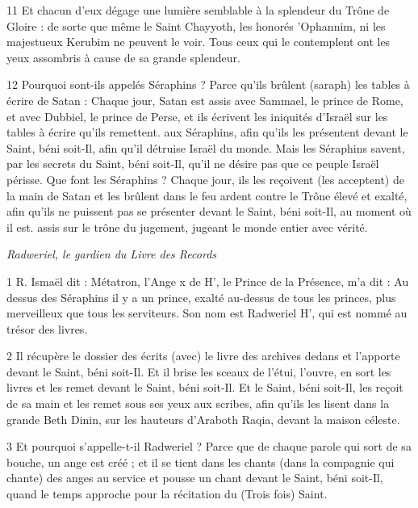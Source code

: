 \par 11 Et chacun d'eux dégage une lumière semblable à la splendeur du Trône de Gloire : de sorte que même le Saint Chayyoth, les honorés 'Ophannim, ni les majestueux Kerubim ne peuvent le voir. Tous ceux qui le contemplent ont les yeux assombris à cause de sa grande splendeur.

\par 12 Pourquoi sont-ils appelés Séraphins ? Parce qu'ils brûlent (saraph) les tables à écrire de Satan : Chaque jour, Satan est assis avec Sammael, le prince de Rome, et avec Dubbiel, le prince de Perse, et ils écrivent les iniquités d'Israël sur les tables à écrire qu'ils remettent. aux Séraphins, afin qu'ils les présentent devant le Saint, béni soit-Il, afin qu'il détruise Israël du monde. Mais les Séraphins savent, par les secrets du Saint, béni soit-Il, qu'il ne désire pas que ce peuple Israël périsse. Que font les Séraphins ? Chaque jour, ils les reçoivent (les acceptent) de la main de Satan et les brûlent dans le feu ardent contre le Trône élevé et exalté, afin qu'ils ne puissent pas se présenter devant le Saint, béni soit-Il, au moment où il est. assis sur le trône du jugement, jugeant le monde entier avec vérité.




\par \textit{Radweriel, le gardien du Livre des Records}

\par 1 R. Ismaël dit : Métatron, l'Ange x de H', le Prince de la Présence, m'a dit : Au dessus des Séraphins il y a un prince, exalté au-dessus de tous les princes, plus merveilleux que tous les serviteurs. Son nom est Radweriel H', qui est nommé au trésor des livres.

\par 2 Il récupère le dossier des écrits (avec) le livre des archives dedans et l'apporte devant le Saint, béni soit-Il. Et il brise les sceaux de l'étui, l'ouvre, en sort les livres et les remet devant le Saint, béni soit-Il. Et le Saint, béni soit-Il, les reçoit de sa main et les remet sous ses yeux aux scribes, afin qu'ils les lisent dans la grande Beth Dinin, sur les hauteurs d'Araboth Raqia, devant la maison céleste.

\par 3 Et pourquoi s'appelle-t-il Radweriel ? Parce que de chaque parole qui sort de sa bouche, un ange est créé ; et il se tient dans les chants (dans la compagnie qui chante) des anges au service et pousse un chant devant le Saint, béni soit-Il, quand le temps approche pour la récitation du (Trois fois) Saint.

